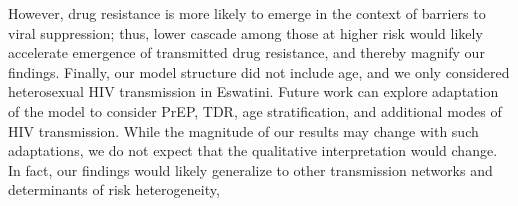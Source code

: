 However, drug resistance is more likely to emerge
in the context of barriers to viral suppression;
thus, lower cascade among those at higher risk
would likely accelerate emergence of transmitted drug resistance,
and thereby magnify our findings.
Finally, our model structure did not include age,
and we only considered heterosexual HIV transmission in Eswatini.
Future work can explore adaptation of the model to consider
PrEP, TDR, age stratification, and additional modes of HIV transmission.
While the magnitude of our results may change with such adaptations,
we do not expect that the qualitative interpretation would change.
In fact, our findings would likely generalize
to other transmission networks and determinants of risk heterogeneity,
